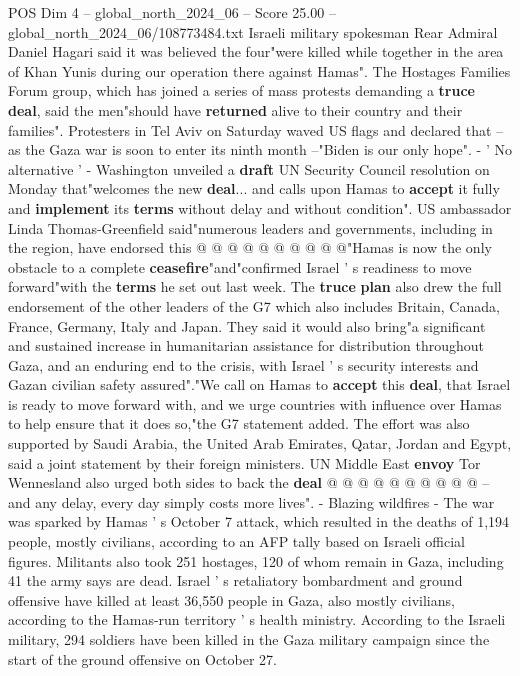 \begin{textsample}{POS Dim 4 – global\_north\_2024\_06 – Score 25.00 – global\_north\_2024\_06/108773484.txt}
Israeli military spokesman Rear Admiral Daniel Hagari said it was believed the four"were killed while together in the area of Khan Yunis during our operation there against Hamas".
The Hostages Families Forum group, which has joined a series of mass protests demanding a \textbf{truce} \textbf{deal}, said the men"should have \textbf{returned} alive to their country and their families".
Protesters in Tel Aviv on Saturday waved US flags and declared that -- as the Gaza war is soon to enter its ninth month --"Biden is our only hope". - ' No alternative ' - Washington unveiled a \textbf{draft} UN Security Council resolution on Monday that"welcomes the new \textbf{deal}... and calls upon Hamas to \textbf{accept} it fully and \textbf{implement} its \textbf{terms} without delay and without condition".
US ambassador Linda Thomas-Greenfield said"numerous leaders and governments, including in the region, have endorsed this @ @ @ @ @ @ @ @ @ @"Hamas is now the only obstacle to a complete \textbf{ceasefire}"and"confirmed Israel ' s readiness to move forward"with the \textbf{terms} he set out last week.
The \textbf{truce} \textbf{plan} also drew the full endorsement of the other leaders of the G7 which also includes Britain, Canada, France, Germany, Italy and Japan.
They said it would also bring"a significant and sustained increase in humanitarian assistance for distribution throughout Gaza, and an enduring end to the crisis, with Israel ' s security interests and Gazan civilian safety assured"."We call on Hamas to \textbf{accept} this \textbf{deal}, that Israel is ready to move forward with, and we urge countries with influence over Hamas to help ensure that it does so,"the G7 statement added.
The effort was also supported by Saudi Arabia, the United Arab Emirates, Qatar, Jordan and Egypt, said a joint statement by their foreign ministers.
UN Middle East \textbf{envoy} Tor Wennesland also urged both sides to back the \textbf{deal} @ @ @ @ @ @ @ @ @ @ -- and any delay, every day simply costs more lives". - Blazing wildfires - The war was sparked by Hamas ' s October 7 attack, which resulted in the deaths of 1,194 people, mostly civilians, according to an AFP tally based on Israeli official figures.
Militants also took 251 hostages, 120 of whom remain in Gaza, including 41 the army says are dead.
Israel ' s retaliatory bombardment and ground offensive have killed at least 36,550 people in Gaza, also mostly civilians, according to the Hamas-run territory ' s health ministry.
According to the Israeli military, 294 soldiers have been killed in the Gaza military campaign since the start of the ground offensive on October 27.

\end{textsample}

